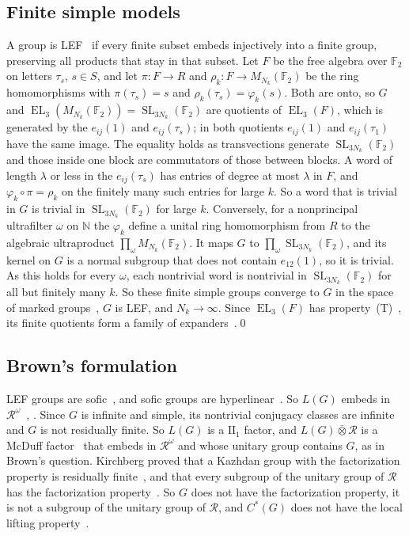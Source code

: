 \documentclass[11pt]{amsart}
\newcommand{\F}{\mathbb F}
\newcommand{\EL}{\operatorname{EL}}
\newcommand{\SL}{\operatorname{SL}}
\begin{document}
\subsection*{Finite simple models}
A group is LEF~\cite{VershikGordon} if every finite subset embeds
injectively into a finite group, preserving all products that stay in
that subset. Let $F$ be the free algebra over $\F_2$ on letters $\tau_s$,
$s\in S$, and let $\pi\colon F\to R$ and $\rho_k\colon F\to M_{N_k}(\F_2)$
be the ring homomorphisms with $\pi(\tau_s)=s$ and
$\rho_k(\tau_s)=\varphi_k(s)$. Both are onto, so $G$ and
$\EL_3(M_{N_k}(\F_2))=\SL_{3N_k}(\F_2)$ are quotients of $\EL_3(F)$, which
is generated by the $e_{ij}(1)$ and $e_{ij}(\tau_s)$; in both quotients
$e_{ij}(1)$ and $e_{ij}(\tau_1)$ have the same image. The equality holds
as transvections generate $\SL_{3N_k}(\F_2)$ and those inside one block are
commutators of those between blocks. A word of length $\lambda$ or less in
the $e_{ij}(\tau_s)$ has entries of degree at most $\lambda$ in $F$, and $\varphi_k\circ\pi=\rho_k$ on the finitely many such entries for
large $k$. So a word that is trivial in $G$ is trivial in
$\SL_{3N_k}(\F_2)$ for large $k$. Conversely, for a nonprincipal
ultrafilter $\omega$ on $\mathbb N$ the $\varphi_k$ define a unital ring
homomorphism from $R$ to the algebraic ultraproduct
$\prod_\omega M_{N_k}(\F_2)$. It maps $G$ to $\prod_\omega\SL_{3N_k}(\F_2)$,
and its kernel on $G$ is a normal subgroup that does not contain
$e_{12}(1)$, so it is trivial. As this holds for every $\omega$, each
nontrivial word is nontrivial in $\SL_{3N_k}(\F_2)$ for all but finitely
many $k$. So these finite simple groups converge to $G$ in the space of
marked groups~\cite{Grigorchuk,Champetier}, $G$ is LEF, and
$N_k\to\infty$. Since $\EL_3(F)$ has property~\textup{(T)}~\cite[Theorem~1.1]{EJZ},
its finite quotients form a family of expanders~\cite{Margulis,Kassabov}.\qed

\subsection*{Brown's formulation}
LEF groups are sofic~\cite[Example~4.5]{Pestov}, and sofic groups are
hyperlinear~\cite[Theorem~2]{ElekSzabo}. So $L(G)$ embeds in
$\mathcal R^\omega$~\cite{Kirchberg,Radulescu},
\cite[Proposition~7.1]{Ozawa}. Since $G$ is infinite and simple, its
nontrivial conjugacy classes are infinite and $G$ is not residually
finite. So $L(G)$ is a $\mathrm{II}_1$ factor, and
$L(G)\mathbin{\bar\otimes}\mathcal R$ is a McDuff factor~\cite{McDuff}
that embeds in $\mathcal R^\omega$ and whose unitary group contains $G$,
as in Brown's question. Kirchberg proved that a Kazhdan group with the
factorization property is residually
finite~\cite[Theorem~1.1]{Kirchberg}, and that every subgroup of the
unitary group of $\mathcal R$ has the factorization
property~\cite[Corollary~1.2]{Kirchberg}. So $G$ does not have the
factorization property, it is not a subgroup of the unitary group of
$\mathcal R$, and $C^*(G)$ does not have the local lifting
property~\cite[p.~527]{Ozawa}.
\end{document}
